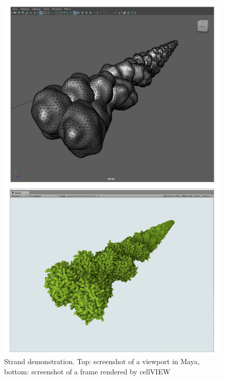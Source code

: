 \documentclass[
  digital, %
  table,   %
  nolof,     %
  nolot,     %
  oneside,
]{fithesis3}
\begin{document}
\begin{figure}
  \centering
  \includegraphics[scale=0.4]{images/strand-1-vertical.jpg}
  \caption{Strand demonstration. Top: screenshot of a viewport in Maya, bottom: screenshot of a frame rendered by cellVIEW}
  \label{fig:strand1}
\end{figure}

\end{document}
